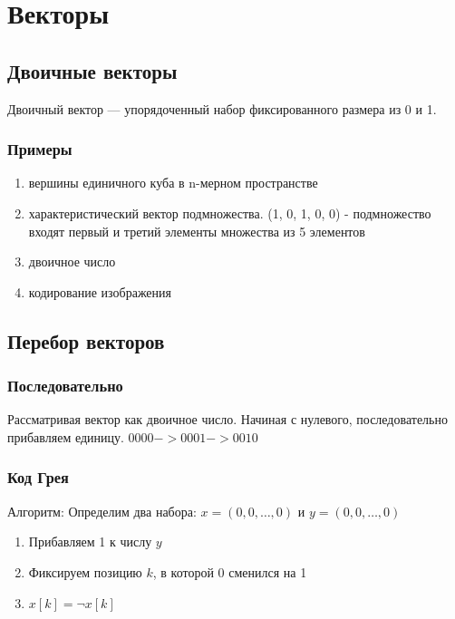 \documentclass[main]{subfiles}
\begin{document}
\chapter{Векторы}

\section{Двоичные векторы}

\begin{definition}
    Двоичный вектор --- упорядоченный набор фиксированного размера из 0 и 1.
\end{definition}

\subsection{Примеры}
\begin{enumerate}
    \item вершины единичного куба в n-мерном пространстве 
    \item характеристический вектор подмножества. (1, 0, 1, 0, 0) - подмножество 
входят первый и третий элементы множества из 5 элементов
    \item двоичное число
    \item кодирование изображения
\end{enumerate}

\section{Перебор векторов}
\subsection{Последовательно}
Рассматривая вектор как двоичное число. Начиная с нулевого, последовательно 
прибавляем единицу. $0000 -> 0001 -> 0010$

\subsection{Код Грея}
Алгоритм: Определим два набора: $x = \left(0, 0, \ldots, 0\right)$ и 
$y = \left(0, 0, \ldots, 0\right)$
\begin{enumerate}
    \item Прибавляем 1 к числу $y$
    \item Фиксируем позицию $k$, в которой 0 сменился на 1
    \item $x[k] = \lnot x[k]$
\end{enumerate}
\end{document}
